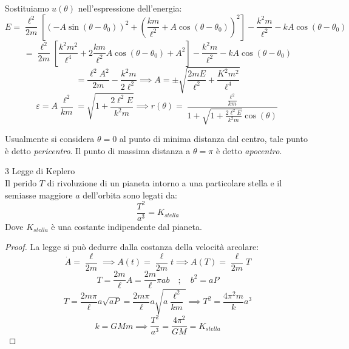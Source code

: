 Sostituiamo $u(\theta)$ nell'espressione dell'energia:
\begin{equation*}
    E = \frac{\ell^2}{2m}\left[ \left( -A\sin(\theta-\theta_0) \right)^2+\left( \frac{km}{\ell^2}+A\cos(\theta-\theta_0) \right)^2 \right]
    -\frac{k^2m}{\ell^2}-kA\cos(\theta-\theta_0)
\end{equation*}
\begin{equation*}
    =\frac{\ell^2}{2m}\left[\frac{k^2m^2}{\ell^4}+2\frac{km}{\ell^2}A\cos(\theta-\theta_0) +A^2\right]
    -\frac{k^2m}{\ell^2}-kA\cos(\theta-\theta_0)
\end{equation*}
\begin{equation}
    =\frac{\ell^2A^2}{2m}-\frac{k^2m}{2\ell^2}\implies A = \pm \sqrt{\frac{2mE}{\ell^2}+\frac{K^2m^2}{\ell^4}}
\end{equation}
\begin{equation}
    \varepsilon= A\frac{\ell^2}{km}= \sqrt{1+\frac{2\ell^2E}{k^2m}}\implies 
    r(\theta)= \frac{\frac{\ell^2}{km}}{1+\sqrt{1+\frac{2\ell^2E}{k^2m}}\cos(\theta)}
\end{equation}

\begin{definition}
    Usualmente si considera $\theta=0$ al punto di minima distanza dal centro, tale punto è detto \textit{pericentro}.
    Il punto di massima distanza a $\theta= \pi$ è detto \textit{apocentro}.
\end{definition}

\begin{theorem}
    3 Legge di Keplero\\
    Il perido $T$ di rivoluzione di un pianeta intorno a una particolare stella e il semiasse maggiore $a$ dell'orbita
    sono legati da:
    \begin{equation}
        \frac{T^2}{a^3}=K_{stella}
    \end{equation}
    Dove $K_{stella}$ è una costante indipendente dal pianeta.
\end{theorem}
\begin{proof}
    La legge si può dedurre dalla costanza della velocità areolare:
    \begin{equation*}
        \dot{A}= \frac{\ell}{2m}\implies A(t)= \frac{\ell}{2m}t \implies    A(T)= \frac{\ell}{2m}T
    \end{equation*}
    \begin{equation*}
        T = \frac{2m}{\ell}A= \frac{2m}{\ell}\pi ab\quad ; \quad b^2 = aP
    \end{equation*}
    \begin{equation*}
        T = \frac{2m\pi}{\ell}a\sqrt{aP}= \frac{2m\pi}{\ell}a\sqrt{a\frac{\ell^2}{km}}
        \implies T^2 = \frac{4\pi^2m}{k}a^3
    \end{equation*}
    \begin{equation*}
        k = GMm \implies \frac{T^2}{a^3}= \frac{4\pi^2}{GM}= K_{stella}
    \end{equation*}
\end{proof}



